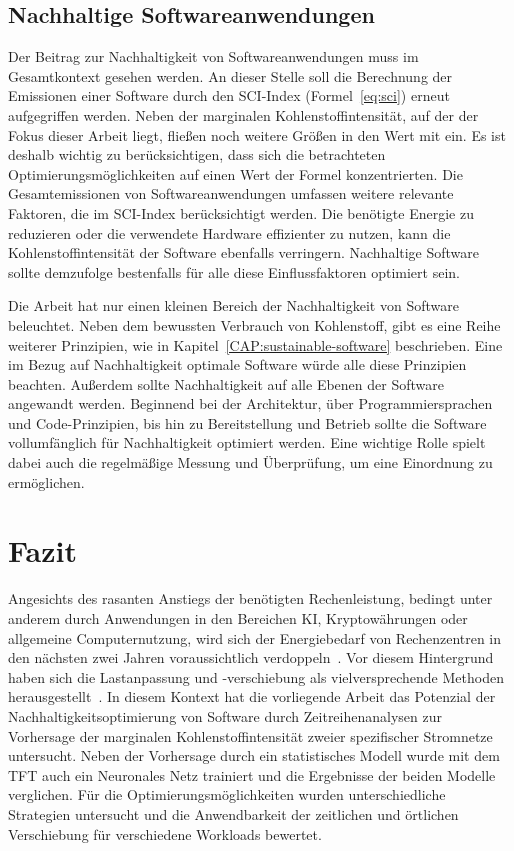 \section{Nachhaltige Softwareanwendungen}
Der Beitrag zur Nachhaltigkeit von Softwareanwendungen muss im Gesamtkontext gesehen werden.
An dieser Stelle soll die Berechnung der Emissionen einer Software durch den \ac{SCI}-Index (Formel~\ref{eq:sci}) erneut aufgegriffen werden.
Neben der marginalen Kohlenstoffintensität, auf der der Fokus dieser Arbeit liegt, fließen noch weitere Größen in den Wert mit ein.
Es ist deshalb wichtig zu berücksichtigen, dass sich die betrachteten Optimierungsmöglichkeiten auf einen Wert der Formel konzentrierten.
Die Gesamtemissionen von Softwareanwendungen umfassen weitere relevante Faktoren, die im \ac{SCI}-Index berücksichtigt werden.
Die benötigte Energie zu reduzieren oder die verwendete Hardware effizienter zu nutzen, kann die Kohlenstoffintensität der Software ebenfalls verringern.
Nachhaltige Software sollte demzufolge bestenfalls für alle diese Einflussfaktoren optimiert sein.

Die Arbeit hat nur einen kleinen Bereich der Nachhaltigkeit von Software beleuchtet.
Neben dem bewussten Verbrauch von Kohlenstoff, gibt es eine Reihe weiterer Prinzipien, wie in Kapitel~\ref{CAP:sustainable-software} beschrieben.
Eine im  Bezug auf Nachhaltigkeit optimale Software würde alle diese Prinzipien beachten.
Außerdem sollte Nachhaltigkeit auf alle Ebenen der Software angewandt werden.
Beginnend bei der Architektur, über Programmiersprachen und Code-Prinzipien, bis hin zu Bereitstellung und Betrieb sollte die Software vollumfänglich für Nachhaltigkeit optimiert werden.
Eine wichtige Rolle spielt dabei auch die regelmäßige Messung und Überprüfung, um eine Einordnung zu ermöglichen.
\chapter{Fazit}\label{CAP:resumee}
\noindent Angesichts des rasanten Anstiegs der benötigten Rechenleistung, bedingt unter anderem durch Anwendungen in den Bereichen \ac{KI}, Kryptowährungen oder allgemeine Computernutzung, wird sich der Energiebedarf von Rechenzentren in den nächsten zwei Jahren voraussichtlich verdoppeln~\cite{WattTime.12.3.2024}.
Vor diesem Hintergrund haben sich die Lastanpassung und -verschiebung als vielversprechende Methoden herausgestellt~\cite{WattTime.12.3.2024}.
In diesem Kontext hat die vorliegende Arbeit das Potenzial der Nachhaltigkeitsoptimierung von Software durch Zeitreihenanalysen zur Vorhersage der marginalen Kohlenstoffintensität zweier spezifischer Stromnetze untersucht.
Neben der Vorhersage durch ein statistisches Modell wurde mit dem \ac{TFT} auch ein Neuronales Netz trainiert und die Ergebnisse der beiden Modelle verglichen.
Für die Optimierungsmöglichkeiten wurden unterschiedliche Strategien untersucht und die Anwendbarkeit der zeitlichen und örtlichen Verschiebung für verschiedene Workloads bewertet.

